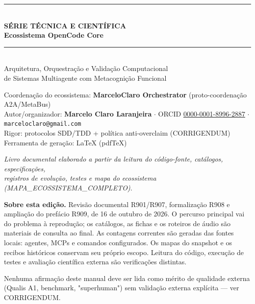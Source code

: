 \thispagestyle{plain}
\vspace*{0.17\paperheight}
\begin{center}
\sffamily
{\color{plumAccent}\rule{0.16\linewidth}{1.4pt}}\\[8pt]
{\small\bfseries\color{steel}\MakeUppercase{Série técnica e científica}}\\[12pt]
{\fontsize{25}{29}\selectfont\bfseries\color{textmain}Ecossistema OpenCode Core}\\[10pt]
{\color{plumAccent}\rule{0.32\linewidth}{0.8pt}}\\[12pt]
{\large\color{textmuted}Arquitetura, Orquestração e Validação Computacional\\
de Sistemas Multiagente com Metacognição Funcional}\\[22pt]
\begin{tcolorbox}[width=0.9\linewidth,colback=panel,colframe=plumAccent,boxrule=0.6pt,arc=1.5mm,left=5mm,right=5mm,top=4mm,bottom=4mm]
{\small Coordenação do ecossistema: \textbf{MarceloClaro Orchestrator} (proto-coordenação A2A/MetaBus)\\[3pt]
Autor/organizador: \textbf{Marcelo Claro Laranjeira} \;$\cdot$\; ORCID \href{https://orcid.org/0000-0001-8996-2887}{0000-0001-8996-2887} \;$\cdot$\; \texttt{marceloclaro@gmail.com}\\[3pt]
Rigor: protocolos SDD/TDD + política anti-overclaim (CORRIGENDUM)\\[3pt]
Ferramenta de geração: LaTeX (pdf\TeX)}
\end{tcolorbox}
\vspace{14pt}
{\small\itshape\color{textmuted}Livro documental elaborado a partir da leitura do código-fonte, catálogos, especificações,\\
registros de evolução, testes e mapa do ecossistema (MAPA\_ECOSSISTEMA\_COMPLETO).}
\end{center}
\vfill
\begin{minipage}{\linewidth}
\small\color{textmuted}
\textbf{Sobre esta edição.} Revisão documental R901/R907, formalização R908 e ampliação do prefácio R909, de 16 de outubro de 2026.
O percurso principal vai do problema à reprodução; os catálogos, as fichas e os
roteiros de áudio são materiais de consulta ao final. As contagens correntes são
geradas das fontes locais: \CoreAgentCount{} agentes, \CoreMCPCount{} MCPs e
\CoreCommandCount{} comandos configurados. Os mapas do snapshot 
e os recibos históricos conservam seu próprio escopo. Leitura do código,
execução de testes e avaliação científica externa são verificações distintas.
\end{minipage}
\vspace{5mm}
{\small\sffamily\centering Nenhuma afirmação deste manual deve ser lida como mérito de qualidade externa\\[1pt]
(Qualis A1, benchmark, "superhuman") sem validação externa explícita — ver CORRIGENDUM.\par}
\vspace*{8mm}
\clearpage

\tableofcontents
\clearpage
